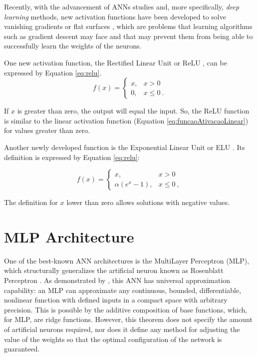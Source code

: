 Recently, with the advancement of ANNs studies and, more specifically, \textit{deep learning} methods, new activation functions have been developed to solve vanishing gradients or flat surfaces \cite{Fahlman1988}, which are problems that learning algorithms such as gradient descent may face and that may prevent them from being able to successfully learn the weights of the neurons.

One new activation function, the Rectified Linear Unit or ReLU \cite{Maas2013}, can be expressed by Equation \ref{eq:relu}.
\begin{equation}
	\label{eq:relu}
	f(x) = \left\{\begin{matrix}
		x, & x > 0    \\
		0, & x \leq 0 \:.
	\end{matrix}\right.
\end{equation}

\noindent
If $x$ is greater than zero, the output will equal the input. So, the ReLU function is similar to the linear activation function (Equation \ref{eq:funcaoAtivacaoLinear}) for values greater than zero. %

Another newly developed function is the Exponential Linear Unit or ELU \cite{Clevert2016}. Its definition is expressed by Equation \ref{eq:relu}:

\begin{equation}
	\label{eq:elu}
	f(x) = \left\{\begin{matrix}
		x,               & x > 0    \\
		\alpha(e^x - 1), & x \leq 0 \:,
	\end{matrix}\right.
\end{equation}

The definition for $x$ lower than zero allows solutions with negative values.

\section{MLP Architecture}
\label{sec:mlp}

One of the best-known ANN architectures is the MultiLayer Perceptron (MLP), which structurally generalizes the artificial neuron known as Rosenblatt Perceptron \cite{Rosenblatt1958}. As demonstrated by \cite{Cybenko1989}, this ANN has universal approximation capability: an MLP can approximate any continuous, bounded, differentiable, nonlinear function with defined inputs in a compact space with arbitrary precision. This is possible by the additive composition of base functions, which, for MLP, are ridge functions. However, this theorem does not specify the amount of artificial neurons required, nor does it define any method for adjusting the value of the weights so that the optimal configuration of the network is guaranteed.

